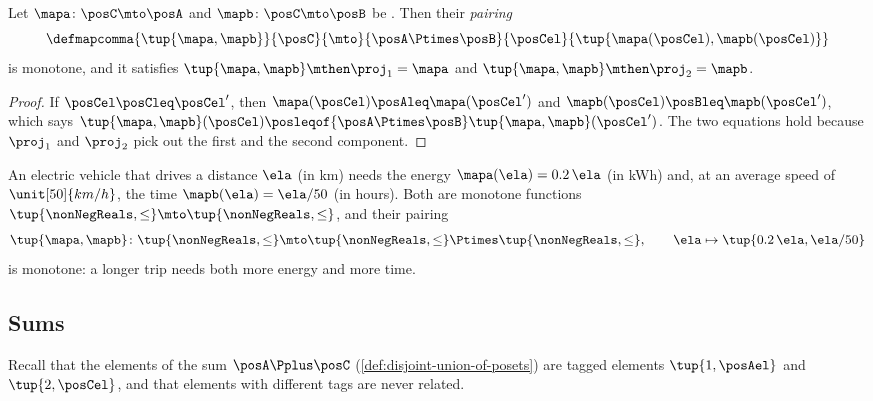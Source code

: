 \begin{lemma}
    \label{lem:monotone-pairing}
    Let $\mapa \colon \posC \mto \posA$ and $\mapb \colon \posC \mto \posB$ be .
    Then their \emph{pairing}
    \begin{equation}
        \defmapcomma{
            \tup{\mapa, \mapb}
        }{
            \posC
        }{
            \mto
        }{
            \posA \Ptimes \posB
        }{
            \posCel
        }{
            \tup{\mapa(\posCel), \mapb(\posCel)}
        }
    \end{equation}
    is monotone, and it satisfies $\tup{\mapa, \mapb} \mthen \proj_1 = \mapa$ and $\tup{\mapa, \mapb} \mthen \proj_2 = \mapb$.
\end{lemma}
\begin{proof}
    If $\posCel \posCleq \posCel'$, then $\mapa(\posCel) \posAleq \mapa(\posCel')$ and $\mapb(\posCel) \posBleq \mapb(\posCel')$, which says $\tup{\mapa, \mapb}(\posCel) \posleqof{\posA \Ptimes \posB} \tup{\mapa, \mapb}(\posCel')$.
    The two equations hold because $\proj_1$ and $\proj_2$ pick out the first and the second component.
\end{proof}

\begin{example}
    \label{exa:monotone-pairing-trip}
    An electric vehicle that drives a distance $\ela$ (in km) needs the energy $\mapa(\ela) = 0.2 \, \ela$ (in kWh) and, at an average speed of $\unit[50]{km/h}$, the time $\mapb(\ela) = \ela / 50$ (in hours).
    Both are monotone functions $\tup{\nonNegReals, \leq} \mto \tup{\nonNegReals, \leq}$, and their pairing
    \begin{equation}
        \tup{\mapa, \mapb} \colon \tup{\nonNegReals, \leq} \mto \tup{\nonNegReals, \leq} \Ptimes \tup{\nonNegReals, \leq},
        \qquad
        \ela \mapsto \tup{0.2 \, \ela, \ela / 50}
    \end{equation}
    is monotone: a longer trip needs both more energy and more time.
\end{example}

\subsection{Sums}

Recall that the elements of the sum $\posA \Pplus \posC$ (\cref{def:disjoint-union-of-posets}) are tagged elements $\tup{1, \posAel}$ and $\tup{2, \posCel}$, and that elements with different tags are never related.

